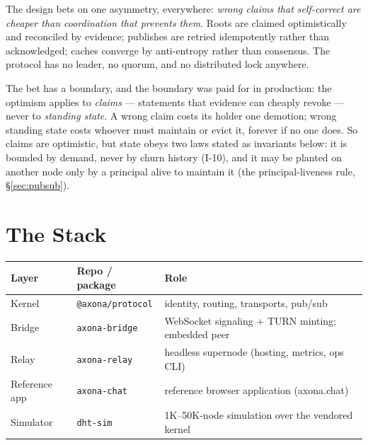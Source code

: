 \documentclass[nobib]{tufte-handout}
\begin{document}
The design bets on one asymmetry, everywhere: \emph{wrong claims that
self-correct are cheaper than coordination that prevents them}. Roots
are claimed optimistically and reconciled by evidence; publishes are
retried idempotently rather than acknowledged; caches converge by
anti-entropy rather than consensus. The protocol has no leader, no
quorum, and no distributed lock anywhere.

The bet has a boundary, and the boundary was paid for in
production: the optimism
applies to \emph{claims} --- statements that evidence can cheaply
revoke --- never to \emph{standing state}. A wrong claim costs its
holder one demotion; wrong standing state costs whoever must maintain
or evict it, forever if no one does. So claims are optimistic, but
state obeys two laws stated as invariants below: it is bounded by
demand, never by churn history (I-10), and it may be planted on
another node only by a principal alive to maintain it (the
principal-liveness rule, \S\ref{sec:pubsub}).

\section{The Stack}

\begin{table}[h]
\scriptsize
\begin{tabular}{@{}lll@{}}
\toprule
Layer & Repo / package & Role \\
\midrule
Kernel & \texttt{@axona/protocol} & identity, routing, transports, pub/sub \\
Bridge & \texttt{axona-bridge} & WebSocket signaling + TURN minting; embedded peer \\
Relay & \texttt{axona-relay} & headless supernode (hosting, metrics, ops CLI) \\
Reference app & \texttt{axona-chat} & reference browser application (axona.chat) \\
Simulator & \texttt{dht-sim} & 1K--50K-node simulation over the vendored kernel \\
\bottomrule
\end{tabular}
\end{table}
\end{document}
